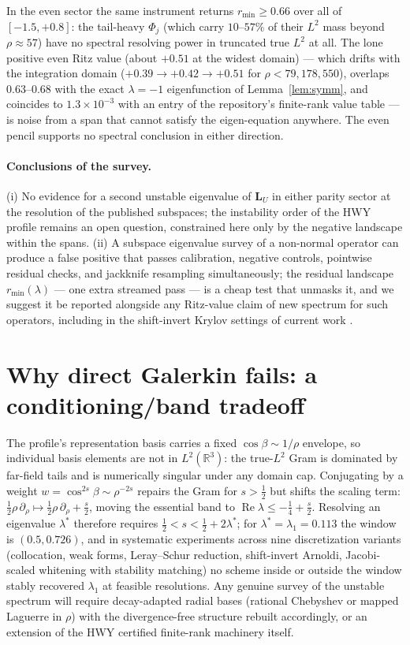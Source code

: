 \documentclass[11pt]{article}
\newcommand{\R}{\mathbb{R}}
\newcommand{\LU}{\mathbf{L}_{U}}
\newcommand{\rmin}{r_{\min}}
\theoremstyle{plain}
\theoremstyle{remark}
\begin{document}
In the even sector the same instrument returns $\rmin \ge 0.66$ over
all of $[-1.5, +0.8]$: the tail-heavy $\Phi_j$ (which carry
$10$--$57\%$ of their $L^2$ mass beyond $\rho \approx 57$) have no
spectral resolving power in truncated true $L^2$ at all. The lone
positive even Ritz value (about $+0.51$ at the widest domain) --- which
drifts with the integration domain ($+0.39 \to +0.42 \to +0.51$ for
$\rho < 79, 178, 550$), overlaps $0.63$--$0.68$ with the exact
$\lambda = -1$ eigenfunction of Lemma~\ref{lem:symm}, and coincides to
$1.3\times 10^{-3}$ with an entry of the repository's finite-rank value
table --- is noise from a span that cannot satisfy the eigen-equation
anywhere. The even pencil supports no spectral conclusion in either
direction.

\paragraph{Conclusions of the survey.} (i) No evidence for a second
unstable eigenvalue of $\LU$ in either parity sector at the resolution
of the published subspaces; the instability order of the HWY profile
remains an open question, constrained here only by the negative
landscape within the spans. (ii) A subspace eigenvalue survey of a
non-normal operator can produce a false positive that passes
calibration, negative controls, pointwise residual checks, and
jackknife resampling simultaneously; the residual landscape
$\rmin(\lambda)$ --- one extra streamed pass --- is a cheap test that
unmasks it, and we suggest it be reported alongside any Ritz-value
claim of new spectrum for such operators, including in the
shift-invert Krylov settings of current work \cite{IJP26,WLGSB25}.

\section{Why direct Galerkin fails: a conditioning/band
tradeoff}\label{sec:obstruction}
The profile's representation basis carries a fixed $\cos\beta \sim
1/\rho$ envelope, so individual basis elements are not in $L^2(\R^3)$:
the true-$L^2$ Gram is dominated by far-field tails and is numerically
singular under any domain cap. Conjugating by a weight
$w = \cos^{2s}\beta \sim \rho^{-2s}$ repairs the Gram for $s>\tfrac12$
but shifts the scaling term: $\tfrac12\rho\,\partial_\rho \mapsto
\tfrac12\rho\,\partial_\rho + \tfrac{s}{2}$, moving the essential band
to $\operatorname{Re}\lambda \le -\tfrac14 + \tfrac{s}{2}$. Resolving an
eigenvalue $\lambda^\ast$ therefore requires
$\tfrac12 < s < \tfrac12 + 2\lambda^\ast$; for
$\lambda^\ast = \lambda_1 = 0.113$ the window is $(0.5, 0.726)$, and in
systematic experiments across nine discretization variants (collocation,
weak forms, Leray--Schur reduction, shift-invert Arnoldi, Jacobi-scaled
whitening with stability matching) no scheme inside or outside the
window stably recovered $\lambda_1$ at feasible resolutions. Any
genuine survey of the unstable spectrum will require decay-adapted
radial bases (rational Chebyshev or mapped Laguerre in $\rho$) with the
divergence-free structure rebuilt accordingly, or an extension of the
HWY certified finite-rank machinery itself.
\end{document}
